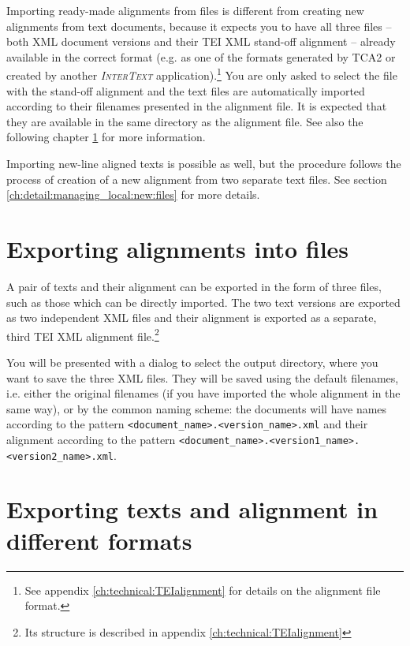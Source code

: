 \documentclass[a4paper,10pt,oneside]{book}
\newcommand{\IT}{\textit{\textsc{InterText}}\xspace}
\begin{document}
Importing ready-made alignments from files is different from creating new alignments from text documents, because it expects you to have all three files -- both XML document versions and their TEI XML stand-off alignment -- already available in the correct format (e.g. as one of the formats generated by TCA2 or created by another \IT application).\footnote{See appendix \ref{ch:technical:TEIalignment} for details on the alignment file format.} You are only asked to select the file with the stand-off alignment and the text files are automatically imported according to their filenames presented in the alignment file. It is expected that they are available in the same directory as the alignment file. See also the following chapter \ref{ch:detail:managing_local:export} for more information.

Importing new-line aligned texts is possible as well, but the procedure follows the process of creation of a new alignment from two separate text files. See section \ref{ch:detail:managing_local:new:files} for more details.

\section{Exporting alignments into files}\label{ch:detail:managing_local:export}

A pair of texts and their alignment can be exported in the form of three files, such as those which can be directly imported. The two text versions are exported as two independent XML files and their alignment is exported as a separate, third TEI XML alignment file.\footnote{Its structure is described in appendix \ref{ch:technical:TEIalignment}}

You will be presented with a dialog to select the output directory, where you want to save the three XML files. They will be saved using the default filenames, i.e. either the original filenames (if you have imported the whole alignment in the same way), or by the common naming scheme: the documents will have names according to the pattern \texttt{<document\_name>.<version\_name>.xml} and their alignment according to the pattern \texttt{<document\_name>.<version1\_name>.<version2\_name>.xml}.

\section{Exporting texts and alignment in different formats}\label{ch:detail:managing_local:export_texts}
\end{document}
